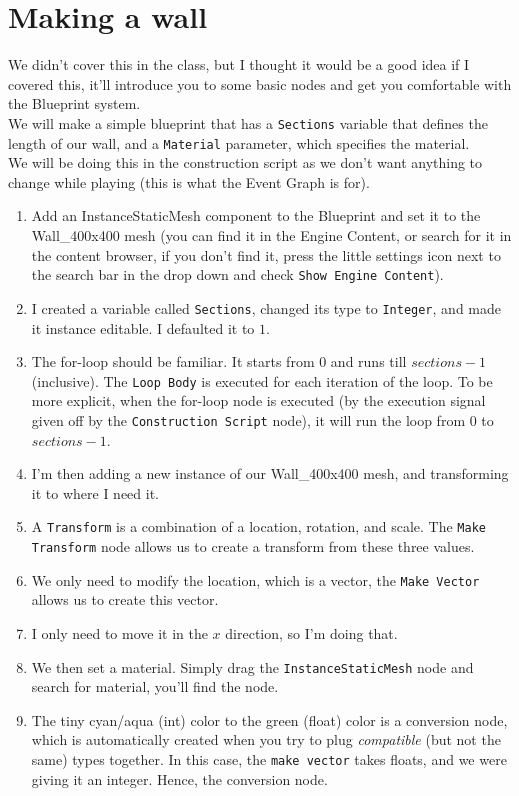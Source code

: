 \documentclass{article}
\begin{document}
\section{Making a wall}
We didn't cover this in the class, but I thought it would be a good idea if I covered this, it'll introduce you to some basic nodes and get you comfortable with the Blueprint system.
\\[10pt]
We will make a simple blueprint that has a \verb|Sections| variable that defines the length of our wall, and a \verb|Material| parameter, which specifies the material. 
\\[10pt]
We will be doing this in the construction script as we don't want anything to change while playing (this is what the Event Graph is for).


\begin{enumerate}
    \item Add an InstanceStaticMesh component to the Blueprint and set it to the Wall\_400x400 mesh (you can find it in the Engine Content, or search for it in the content browser, if you don't find it, press the little settings icon next to the search bar in the drop down and check \verb|Show Engine Content|).
    \item I created a variable called \verb|Sections|, changed its type to \verb|Integer|, and made it instance editable. I defaulted it to $1$.
    \item The for-loop should be familiar. It starts from $0$ and runs till $sections-1$ (inclusive). The \verb|Loop Body| is executed for each iteration of the loop. To be more explicit, when the for-loop node is executed (by the execution signal given off by the \verb|Construction Script| node), it will run the loop from $0$ to $sections-1$.
    \item I'm then adding a new instance of our Wall\_400x400 mesh, and transforming it to where I need it. 
    \item A \verb|Transform| is a combination of a location, rotation, and scale. The \verb|Make Transform| node allows us to create a transform from these three values.
    \item We only need to modify the location, which is a vector, the \verb|Make Vector| allows us to create this vector.
    \item I only need to move it in the $x$ direction, so I'm doing that.
    \item We then set a material. Simply drag the \verb|InstanceStaticMesh| node and search for material, you'll find the node.
    \item The tiny cyan/aqua (int) color to the green (float) color is a conversion node, which is automatically created when you try to plug \emph{compatible} (but not the same) types together. In this case, the \verb|make vector| takes floats, and we were giving it an integer. Hence, the conversion node.
\end{enumerate}
\end{document}
